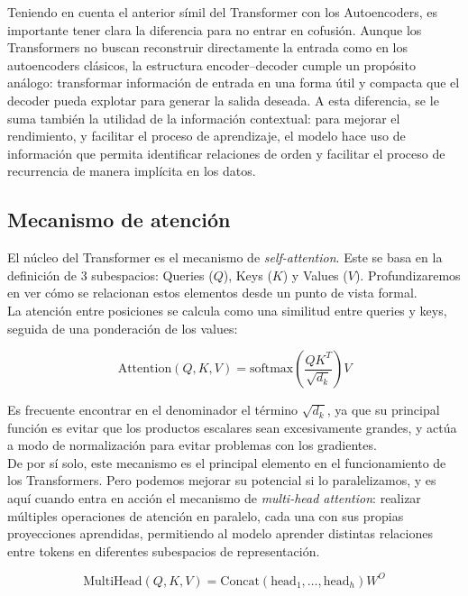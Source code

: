 Teniendo en cuenta el anterior símil del Transformer con los Autoencoders, es importante tener clara la diferencia para no entrar en cofusión. Aunque los Transformers no buscan reconstruir directamente la entrada como en los autoencoders clásicos, la estructura encoder–decoder cumple un propósito análogo: transformar información de entrada en una forma útil y compacta que el decoder pueda explotar para generar la salida deseada. A esta diferencia, se le suma también la utilidad de la información contextual: para mejorar el rendimiento, y facilitar el proceso de aprendizaje, el modelo hace uso de información que permita identificar relaciones de orden y facilitar el proceso de recurrencia de manera implícita en los datos.

\subsection{Mecanismo de atención}

El núcleo del Transformer es el mecanismo de \textit{self-attention}. Este se basa en la definición de 3 subespacios: Queries ($Q$), Keys ($K$) y Values ($V$). Profundizaremos en ver cómo se relacionan estos elementos desde un punto de vista formal.\\

La atención entre posiciones se calcula como una similitud entre queries y keys, seguida de una ponderación de los values:

\begin{equation}
    \text{Attention}(Q, K, V) = \text{softmax} \left( \frac{QK^T}{\sqrt{d_k}} \right)V
\end{equation}

Es frecuente encontrar en el denominador el término $\sqrt{d_k}$, ya que su principal función es evitar que los productos escalares sean excesivamente grandes, y actúa a modo de normalización para evitar problemas con los gradientes.\\

De por sí solo, este mecanismo es el principal elemento en el funcionamiento de los Transformers. Pero podemos mejorar su potencial si lo paralelizamos, y es aquí cuando entra en acción el mecanismo de \textit{multi-head attention}: realizar múltiples operaciones de atención en paralelo, cada una con sus propias proyecciones aprendidas, permitiendo al modelo aprender distintas relaciones entre tokens en diferentes subespacios de representación.

\begin{equation}
    \text{MultiHead}(Q, K, V) = \text{Concat}(\text{head}_1, \ldots, \text{head}_h)W^O
\end{equation}

